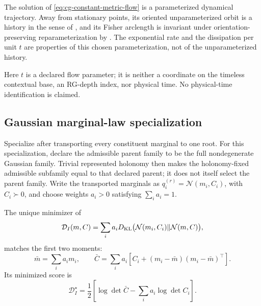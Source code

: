 The solution of \eqref{eq:cg-constant-metric-flow} is a parameterized
dynamical trajectory.  Away from stationary points, its oriented
unparameterized orbit is a history in the sense of
, and its Fisher arclength is invariant under
orientation-preserving reparameterization by
. The exponential rate and the
dissipation per unit \(t\) are properties of this chosen parameterization, not
of the unparameterized history. 

Here \(t\) is a declared flow parameter; it is neither a coordinate on the
timeless contextual base, an RG-depth index, nor physical time. No
physical-time identification is claimed. 

\subsection{Gaussian marginal-law specialization}
\label{sec:cg-gaussian-marginal-law}

Specialize  after transporting every
constituent marginal to one root. For this specialization, declare the
admissible parent family to be the full nondegenerate Gaussian family.
Trivial represented holonomy then makes the holonomy-fixed admissible
subfamily equal to that declared parent; it does not itself select the parent
family. Write the transported marginals as
\(q_i^{(r)}=\mathcal N(m_i,C_i)\), with \(C_i\succ0\), and choose weights
\(a_i>0\) satisfying \(\sum_i a_i=1\). 

The unique minimizer of
\begin{equation}
\mathcal D_I(m,C)
=\sum_i a_iD_{\mathrm{KL}}\bigl(\mathcal N(m_i,C_i)
\Vert\mathcal N(m,C)\bigr),
\label{eq:cg-gaussian-barycenter-objective}
\end{equation}
matches the first two moments:
\begin{equation}
\bar m=\sum_i a_im_i,\qquad
\bar C=\sum_i a_i\left[C_i+(m_i-\bar m)(m_i-\bar m)^\top\right].
\label{eq:cg-gaussian-barycenter-moments}
\end{equation}
Its minimized score is
\begin{equation}
\mathcal D_I^\star
=\frac12\left[
\log\det\bar C-\sum_i a_i\log\det C_i
\right].
\label{eq:cg-gaussian-barycenter-score}
\end{equation}

